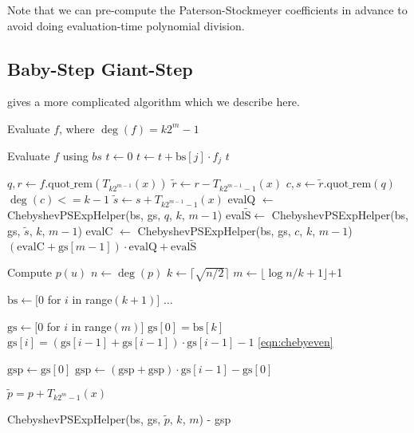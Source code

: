 \documentclass[../fheimpl.tex]{subfiles}
\begin{document}
Note that we can pre-compute the Paterson-Stockmeyer coefficients in advance to avoid doing evaluation-time polynomial division.

\subsection{Baby-Step Giant-Step}
\cite{cryptoeprint:2018/1043} gives a more complicated algorithm which we describe here.

\begin{algorithm}
	\caption{Baby-Step/Giant-Step in Chebyshev Basis}\label{alg:chebyBSGS}
	\begin{algorithmic}[1]
		\Comment Evaluate $f$, where $\deg(f)=k2^m-1$
		
			\Comment Evaluate $f$ using $bs$
			\State $t \gets 0$
				\State $t \gets t + \mathrm{bs}[j]\cdot f_j$
			\EndFor
			\State \Return $t$
		\EndIf
		
		\State $q, r \gets f.\text{quot\_rem}(T_{k2^{m-1}}(x))$
		\State $\tilde{r} \gets r - T_{k2^{m-1}-1}(x)$
		\State $c, s \gets \tilde{r}.\text{quot\_rem}(q)$
		\Comment $\deg(c) <= k-1$
		\State $\tilde{s} \gets s + T_{k2^{m-1}-1}(x)$
		\State evalQ $\gets$ ChebyshevPSExpHelper(\textrm{bs}, \textrm{gs}, $q$, $k$, $m-1$)
		\State eval$\tilde{\mathrm{S}}\gets$ ChebyshevPSExpHelper(\textrm{bs}, \textrm{gs}, $\tilde{s}$, $k$, $m-1$)
		\State evalC $\gets$ ChebyshevPSExpHelper(\textrm{bs}, \textrm{gs}, $c$, $k$, $m-1$)
		\State \Return $(\mathrm{evalC} + \mathrm{gs}[m-1])\cdot \mathrm{evalQ} + \mathrm{eval\tilde{S}}$ \label{loc:expcombo}
		\EndProcedure
		\State
		
		
		\Comment Compute $p(u)$
		\State $n \gets \deg(p)$
		\State $k \gets \lceil \sqrt{n/2}\rceil$
		\State $m \gets \lfloor\log{n/k+1}\rfloor$+1
		
		\State $\mathrm{bs} \gets [0$ for $i$ in range$(k+1)]$
		\State $\ldots$
		
		\State $\mathrm{gs} \gets [0$ for $i$ in range$(m)]$
		\State $\mathrm{gs}[0] = \textrm{bs}[k]$
			\State $\mathrm{gs}[i] = (\mathrm{gs}[i-1]+\mathrm{gs}[i-1])\cdot \mathrm{gs}[i-1] - 1$
		\Comment \cref{eqn:chebyeven}
		\EndFor
		
		\State $\mathrm{gsp} \gets \mathrm{gs}[0]$
			\State $\mathrm{gsp} \gets (\mathrm{gsp}+\mathrm{gsp})\cdot \mathrm{gs}[i-1] - \mathrm{gs}[0]$
		\EndFor
		
		\State $\tilde{p} = p + T_{k2^m-1}(x)$
		
		\State \Return \textrm{ChebyshevPSExpHelper}(\textrm{bs}, \textrm{gs}, $\tilde{p}$, $k$, $m$) - \textrm{gsp}
		
		\EndProcedure
	\end{algorithmic}
\end{algorithm}
\end{document}
